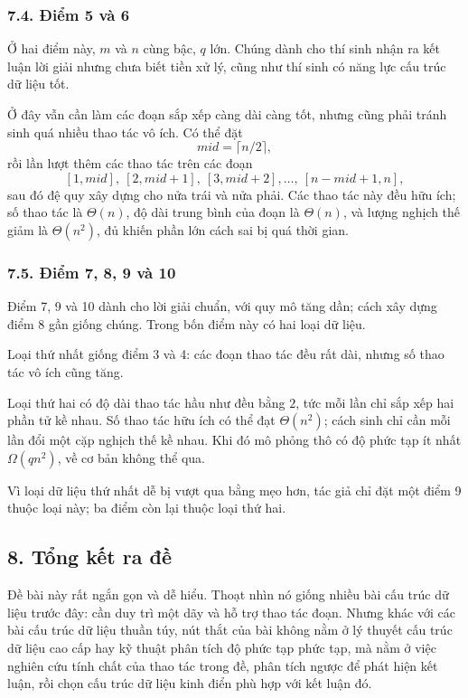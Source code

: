\documentclass[11pt]{article}
\begin{document}
\subsubsection*{7.4. Điểm 5 và 6}

Ở hai điểm này, \(m\) và \(n\) cùng bậc, \(q\) lớn. Chúng dành cho thí sinh
nhận ra kết luận lời giải nhưng chưa biết tiền xử lý, cũng như thí sinh có
năng lực cấu trúc dữ liệu tốt.

Ở đây vẫn cần làm các đoạn sắp xếp càng dài càng tốt, nhưng cũng phải tránh
sinh quá nhiều thao tác vô ích. Có thể đặt
\[
  \mathit{mid}=\lceil n/2\rceil,
\]
rồi lần lượt thêm các thao tác trên các đoạn
\[
  [1,\mathit{mid}],\ [2,\mathit{mid}+1],\
  [3,\mathit{mid}+2],\ldots,\
  [n-\mathit{mid}+1,n],
\]
sau đó đệ quy xây dựng cho nửa trái và nửa phải. Các thao tác này đều hữu
ích; số thao tác là \(\Theta(n)\), độ dài trung bình của đoạn là
\(\Theta(n)\), và lượng nghịch thế giảm là \(\Theta(n^2)\), đủ khiến phần lớn
cách sai bị quá thời gian.

\subsubsection*{7.5. Điểm 7, 8, 9 và 10}

Điểm 7, 9 và 10 dành cho lời giải chuẩn, với quy mô tăng dần; cách xây dựng
điểm 8 gần giống chúng. Trong bốn điểm này có hai loại dữ liệu.

Loại thứ nhất giống điểm 3 và 4: các đoạn thao tác đều rất dài, nhưng số thao
tác vô ích cũng tăng.

Loại thứ hai có độ dài thao tác hầu như đều bằng \(2\), tức mỗi lần chỉ sắp
xếp hai phần tử kề nhau. Số thao tác hữu ích có thể đạt \(\Theta(n^2)\); cách
sinh chỉ cần mỗi lần đổi một cặp nghịch thế kề nhau. Khi đó mô phỏng thô có
độ phức tạp ít nhất \(\Omega(qn^2)\), về cơ bản không thể qua.

Vì loại dữ liệu thứ nhất dễ bị vượt qua bằng mẹo hơn, tác giả chỉ đặt một
điểm 9 thuộc loại này; ba điểm còn lại thuộc loại thứ hai.

\subsection*{8. Tổng kết ra đề}

Đề bài này rất ngắn gọn và dễ hiểu. Thoạt nhìn nó giống nhiều bài cấu trúc dữ
liệu trước đây: cần duy trì một dãy và hỗ trợ thao tác đoạn. Nhưng khác với
các bài cấu trúc dữ liệu thuần túy, nút thắt của bài không nằm ở lý thuyết
cấu trúc dữ liệu cao cấp hay kỹ thuật phân tích độ phức tạp phức tạp, mà nằm
ở việc nghiên cứu tính chất của thao tác trong đề, phân tích ngược để phát
hiện kết luận, rồi chọn cấu trúc dữ liệu kinh điển phù hợp với kết luận đó.
\end{document}
